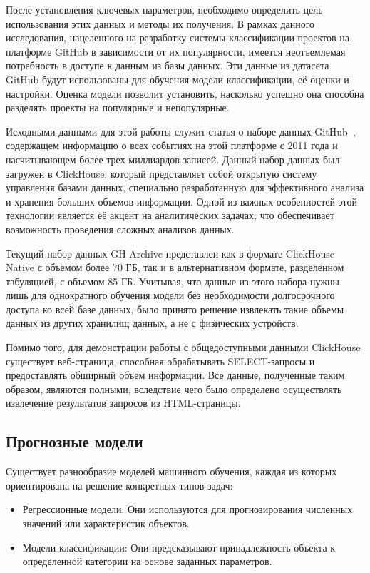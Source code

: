  После установления ключевых параметров, необходимо определить цель использования этих данных и методы их получения. В рамках данного исследования, нацеленного на разработку системы классификации проектов на платформе GitHub в зависимости от их популярности, имеется неотъемлемая потребность в доступе к данным из базы данных. Эти данные из датасета GitHub будут использованы для обучения модели классификации, её оценки и настройки. Оценка модели позволит установить, насколько успешно она способна разделять проекты на популярные и непопулярные.

Исходными данными для этой работы служит статья о наборе данных GitHub~\cite{clickHouse}, содержащем информацию о всех событиях на этой платформе с 2011 года и насчитывающем более трех миллиардов записей. Данный набор данных был загружен в ClickHouse, который представляет собой открытую систему управления базами данных, специально разработанную для эффективного анализа и хранения больших объемов информации. Одной из важных особенностей этой технологии является её акцент на аналитических задачах, что обеспечивает возможность проведения сложных анализов данных.

Текущий набор данных GH Archive представлен как в формате ClickHouse Native с объемом более 70 ГБ, так и в альтернативном формате, разделенном табуляцией, с объемом 85 ГБ. Учитывая, что данные из этого набора нужны лишь для однократного обучения модели без необходимости долгосрочного доступа ко всей базе данных, было принято решение извлекать такие объемы данных из других хранилищ данных, а не с физических устройств.

Помимо того, для демонстрации работы с общедоступными данными ClickHouse существует веб-страница, способная обрабатывать SELECT-запросы и предоставлять обширный объем информации. Все данные, полученные таким образом, являются полными, вследствие чего было определено осуществлять извлечение результатов запросов из HTML-страницы.

\subsection{Прогнозные модели}
\label{sec:Models}

Существует разнообразие моделей машинного обучения, каждая из которых ориентирована на решение конкретных типов задач:
\begin{itemize}
    \item     Регрессионные модели: Они используются для прогнозирования численных значений или характеристик объектов.

    \item     Модели классификации: Они предсказывают принадлежность объекта к определенной категории на основе заданных параметров. 
\end{itemize}

